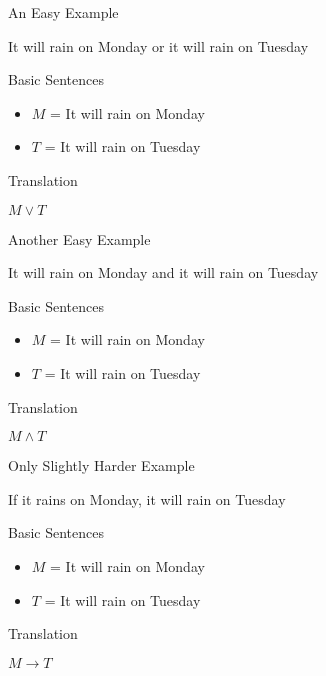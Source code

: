 \documentclass[
  ignorenonframetext,
]{beamer}
\providecommand{\tightlist}{%
  \setlength{\itemsep}{0pt}\setlength{\parskip}{0pt}}
\renewcommand{\,}{\text{, }}
\renewenvironment*{quote}	
	{\list{}{\rightmargin   \leftmargin} \item } 	
	{\endlist }
\begin{document}
\begin{frame}{An Easy Example}
\protect\hypertarget{an-easy-example}{}

\begin{quote}
It will rain on Monday or it will rain on Tuesday
\end{quote}

Basic Sentences

\begin{itemize}
\tightlist
\item
  \(M\) = It will rain on Monday
\item
  \(T\) = It will rain on Tuesday
\end{itemize}

Translation

\begin{quote}
\(M \vee T\)
\end{quote}

\end{frame}

\begin{frame}{Another Easy Example}
\protect\hypertarget{another-easy-example}{}

\begin{quote}
It will rain on Monday and it will rain on Tuesday
\end{quote}

Basic Sentences

\begin{itemize}
\tightlist
\item
  \(M\) = It will rain on Monday
\item
  \(T\) = It will rain on Tuesday
\end{itemize}

Translation

\begin{quote}
\(M \wedge T\)
\end{quote}

\end{frame}

\begin{frame}{Only Slightly Harder Example}
\protect\hypertarget{only-slightly-harder-example}{}

\begin{quote}
If it rains on Monday, it will rain on Tuesday
\end{quote}

Basic Sentences

\begin{itemize}
\tightlist
\item
  \(M\) = It will rain on Monday
\item
  \(T\) = It will rain on Tuesday
\end{itemize}

Translation

\begin{quote}
\(M \rightarrow T\)
\end{quote}

\end{frame}
\end{document}
